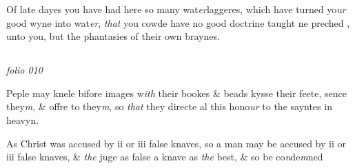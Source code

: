 \documentclass[12pt, a4paper]{book}
\begin{document}
				\marginpar[\vspace{0.5cm}{\textcolor{Gray}{sclaunderous}}]{}
			
				\marginpar[\vspace{0.5cm}{\textcolor{Gray}{n}}]{}
			
		\ifthenelse{\isodd{\thepage}}
		{\reversemarginpar}
		{\normalmarginpar}
		Of late dayes you have had here so many wat\textit{er}laggeres,
 which have turned yo\textit{ur} good wyne into wat\textit{er}, \textit{that} you
 cowde have no good doctrine taught ne preched
			, unto you, but the
 phantasies of their own braynes.
 



\dotfill
						\newpage {} \subsection*{}  \subsection*{}

\textit{folio 010}

	

				\marginpar[\vspace{0.5cm}{\textcolor{Gray}{Images}}]{}
			
				\marginpar[\vspace{0.5cm}{\textcolor{Gray}{n}}]{}
			
		\ifthenelse{\isodd{\thepage}}
		{\reversemarginpar}
		{\normalmarginpar}
		 Peple may knele bifore images w\textit{ith} their bookes \& beads
 kysse their feete, sence they\textit{m}, \& offre to they\textit{m}, so \textit{that}
 they directe al this hono\textit{ur} to the sayntes in heavyn.
	
				\marginpar[\vspace{0.5cm}{\textcolor{Gray}{seditious}}]{}
			
				\marginpar[\vspace{0.5cm}{\textcolor{Gray}{n}}]{}
			
		\ifthenelse{\isodd{\thepage}}
		{\reversemarginpar}
		{\normalmarginpar}
		 As Christ was accused by ii or iii false knaves,
 so a man may be accused by ii or iii false knaves,
 \& \textit{the} juge as false a knave as \textit{the} best, \& so be co\textit{n}de\textit{m}ned
 
\end{document}
